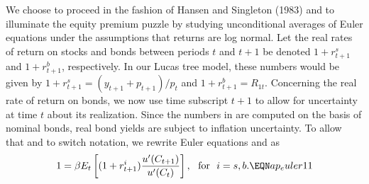 \smallskip\noindent
\caption{Summary statistics for U.S.\ annual data, 1889--1978.
The quantity $1+r^s_{t+1}$ is the real return to stocks,
$1+r^b_{t+1}$ is the real return to relatively riskless bonds, and
$C_{t+1} / C_t$ is the growth rate of per capita real consumption
of nondurables and services. Source: Kocherlakota (1996a, Table 1), who uses the same data as
Mehra and Prescott (1985).}
\endtable
\bigskip

  We choose to proceed in the fashion of Hansen and
Singleton (1983) and
%
%
to illuminate the equity premium puzzle by studying unconditional averages
of Euler equations under the assumptions that returns are  log normal.
Let the real rates of return on stocks and bonds between periods $t$ and
$t+1$ be denoted $1+r^s_{t+1}$ and $1+r^b_{t+1}$, respectively. In our
Lucas  tree model, these numbers would be given by
$1+r^s_{t+1}=(y_{t+1}+p_{t+1})/p_t$ and $1+r^b_{t+1}=R_{1t}$. Concerning
the real rate of return on bonds, we now use time subscript $t+1$ to allow
for uncertainty at time $t$ about its realization. Since the numbers in
 are computed on the basis of nominal bonds, real bond yields
are subject to inflation uncertainty. To allow that and
to switch notation, we rewrite Euler equations  and
 as
$$
1 = \be E_t\left[(1+r^i_{t+1}) {u'(C_{t+1}) \over u'(C_{t})}\right],
              \ \ {\rm for\ \ }i=s,b.                    \EQN ap_euler11
$$

